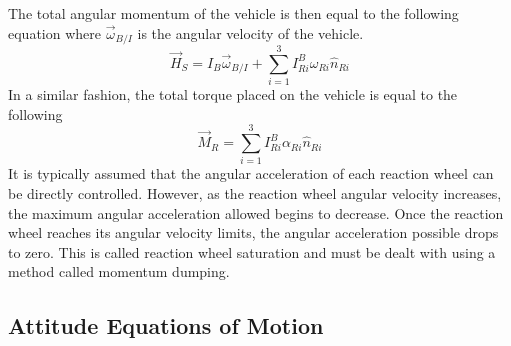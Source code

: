 \documentclass{article}
\begin{document}
The total angular momentum of the vehicle is then equal to the following
equation where $\vec{\omega}_{B/I}$ is the angular velocity of the
vehicle. 
\begin{equation}
  \vec{H}_S = I_B\vec{\omega}_{B/I} + \sum\limits_{i=1}^3
  I^{B}_{Ri}\omega_{Ri}\hat{n}_{Ri}
\end{equation}
In a similar fashion, the total torque placed on the vehicle is
equal to the following
\begin{equation}
  \vec{M}_{R} = \sum\limits_{i=1}^3 I^{B}_{Ri}\alpha_{Ri}\hat{n}_{Ri}
\end{equation}
It is typically assumed that the angular acceleration of each reaction
wheel can be directly controlled. However, as the reaction wheel
angular velocity increases, the maximum angular acceleration allowed
begins to decrease. Once the reaction wheel reaches its angular
velocity limits, the angular acceleration possible drops to zero. This
is called reaction wheel saturation and must be dealt with using a
method called momentum dumping.

\subsection{Attitude Equations of Motion}
\end{document}
